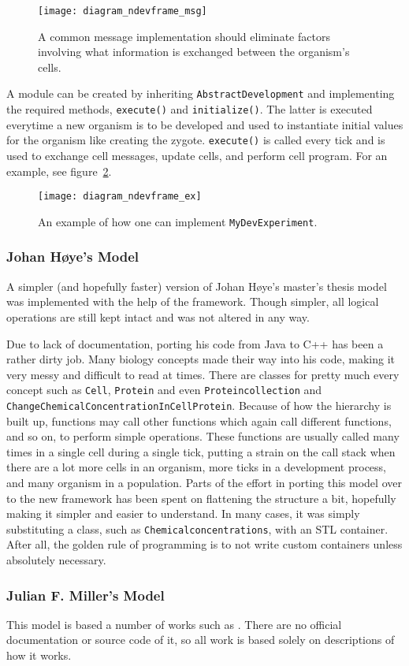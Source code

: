 \begin{figure}[ht]
	\centering
	\texttt{[image: diagram\_ndevframe\_msg]}
	\caption{A common message implementation should eliminate factors involving what information is exchanged between the organism's cells.}
	\label{fig:diagram_ndevframe_msg}
\end{figure}

A module can be created by inheriting \texttt{AbstractDevelopment} and implementing the required methods, \texttt{execute()} and \texttt{initialize()}. The latter is executed everytime a new organism is to be developed and used to instantiate initial values for the organism like creating the zygote. \texttt{execute()} is called every tick and is used to exchange cell messages, update cells, and perform cell program. For an example, see figure~\ref{fig:diagram_ndevframe_ex}.

\begin{figure}[ht]
	\centering
	\texttt{[image: diagram\_ndevframe\_ex]}
	\caption{An example of how one can implement \texttt{MyDevExperiment}.}
	\label{fig:diagram_ndevframe_ex}
\end{figure}


\subsubsection{Johan H{\o}ye's Model}
A simpler (and hopefully faster) version of Johan H{\o}ye's master's thesis\cite{hoye2006} model was implemented with the help of the framework. Though simpler, all logical operations are still kept intact and was not altered in any way.

Due to lack of documentation, porting his code from Java to C++ has been a rather dirty job. Many biology concepts made their way into his code, making it very messy and difficult to read at times. There are classes for pretty much every concept such as \texttt{Cell}, \texttt{Protein} and even \texttt{Proteincollection} and \texttt{ChangeChemicalConcentrationInCellProtein}. Because of how the hierarchy is built up, functions may call other functions which again call different functions, and so on, to perform simple operations. These functions are usually called many times in a single cell during a single tick, putting a strain on the call stack when there are a lot more cells in an organism, more ticks in a development process, and many organism in a population. Parts of the effort in porting this model over to the new framework has been spent on flattening the structure a bit, hopefully making it simpler and easier to understand. In many cases, it was simply substituting a class, such as \texttt{Chemicalconcentrations}, with an STL container. After all, the golden rule of programming is to not write custom containers unless absolutely necessary.

\subsubsection{Julian F. Miller's Model}
This model is based a number of works such as \cite{ecal2003}. There are no official documentation or source code of it, so all work is based solely on descriptions of how it works.
